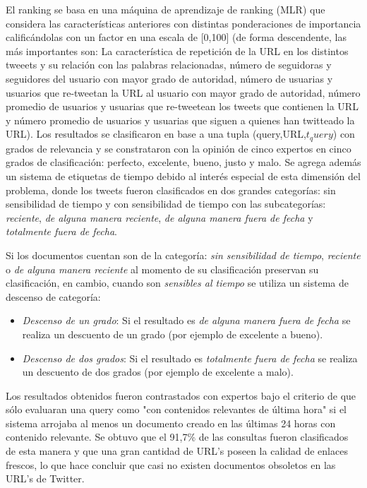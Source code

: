	El ranking se basa en una máquina de aprendizaje de ranking (MLR) que considera las características anteriores con distintas ponderaciones de importancia calificándolas con un factor en una escala de [0,100] (de forma descendente, las más importantes son: La característica de repetición de la URL en los distintos tweeets y su relación con las palabras relacionadas, número de seguidoras y seguidores del usuario con mayor grado de autoridad, número de usuarias y usuarios que re-tweetan la URL al usuario con mayor grado de autoridad, número promedio de usuarios y usuarias que re-tweetean los tweets que contienen la URL y número promedio de usuarios y usuarias que siguen a quienes han twitteado la URL). Los resultados se clasificaron en base a una tupla (query,URL,$t_query$) con grados de relevancia y se constrataron con la opinión de cinco expertos en cinco grados de clasificación: perfecto, excelente, bueno, justo y malo. Se agrega además un sistema de etiquetas de tiempo debido al interés especial de esta dimensión del problema, donde los tweets fueron clasificados en dos grandes categorías: sin sensibilidad de tiempo y con sensibilidad de tiempo con las subcategorías: \emph{reciente}, \emph{de alguna manera reciente}, \emph{de alguna manera fuera de fecha} y \emph{totalmente fuera de fecha}.
	
	Si los documentos cuentan son de la categoría: \emph{sin sensibilidad de tiempo}, \emph{reciente} o \emph{de alguna manera reciente} al momento de su clasificación preservan su clasificación, en cambio, cuando son \emph{sensibles al tiempo} se utiliza un sistema de descenso de categoría:
	
	\begin{itemize}
		\item \emph{Descenso de un grado}: Si el resultado es \emph{de alguna manera fuera de fecha} se realiza un descuento de un grado (por ejemplo de excelente a bueno).
		\item \emph{Descenso de dos grados}: Si el resultado es \emph{totalmente fuera de fecha} se realiza un descuento de dos grados (por ejemplo de excelente a malo).
	\end{itemize}
	
	Los resultados obtenidos fueron contrastados con expertos bajo el criterio de que sólo evaluaran una query como "con contenidos relevantes de última hora" si el sistema arrojaba al menos un documento creado en las últimas 24 horas con contenido relevante. Se obtuvo que el 91,7\% de las consultas fueron clasificados de esta manera y que una gran cantidad de URL's poseen la calidad de enlaces frescos, lo que hace concluir que casi no existen documentos obsoletos en las URL's de Twitter. 
	
